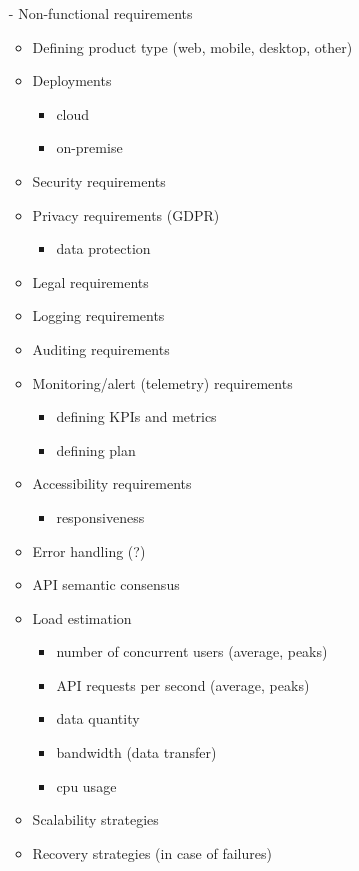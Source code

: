 \documentclass[
	fontsize=10pt, %
	twoside=false, %
	secnumdepth=1, %
]{kaobook}
\begin{document}
\begin{itemize}
		\item[-] Non-functional requirements
			\begin{itemize}
				\item Defining product type (web, mobile, desktop, other)
				\item Deployments
					\begin{itemize}
						\item cloud
						\item on-premise
					\end{itemize}
				\item Security requirements
				\item Privacy requirements (GDPR)
					\begin{itemize}
						\item data protection
					\end{itemize}
				\item Legal requirements
				\item Logging requirements
				\item Auditing requirements
				\item Monitoring/alert (telemetry) requirements
					\begin{itemize}
						\item defining KPIs and metrics
						\item defining plan
					\end{itemize}
				\item Accessibility requirements
					\begin{itemize}
						\item responsiveness
					\end{itemize}
				\item Error handling (?)
				\item API semantic consensus
				\item Load estimation
					\begin{itemize}
						\item number of concurrent users (average, peaks)
						\item API requests per second (average, peaks)
						\item data quantity
						\item bandwidth (data transfer)
						\item cpu usage
					\end{itemize}
				\item Scalability strategies
				\item Recovery strategies (in case of failures)

\end{itemize}
\end{itemize}
\end{document}
